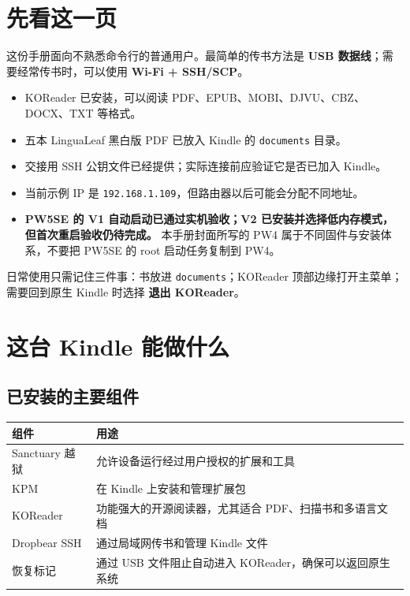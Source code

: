 \documentclass[10pt,a4paper]{article}
\begin{document}
\tableofcontents
\clearpage

\section{先看这一页}

这份手册面向不熟悉命令行的普通用户。最简单的传书方法是 \textbf{USB 数据线}；需要经常传书时，可以使用 \textbf{Wi-Fi + SSH/SCP}。

\begin{statusbox}
\begin{itemize}
  \item KOReader 已安装，可以阅读 PDF、EPUB、MOBI、DJVU、CBZ、DOCX、TXT 等格式。
  \item 五本 LinguaLeaf 黑白版 PDF 已放入 Kindle 的 \texttt{documents} 目录。
  \item 交接用 SSH 公钥文件已经提供；实际连接前应验证它是否已加入 Kindle。
  \item 当前示例 IP 是 \texttt{192.168.1.109}，但路由器以后可能会分配不同地址。
  \item \textbf{PW5SE 的 V1 自动启动已通过实机验收；V2 已安装并选择低内存模式，但首次重启验收仍待完成。} 本手册封面所写的 PW4 属于不同固件与安装体系，不要把 PW5SE 的 root 启动任务复制到 PW4。
\end{itemize}
\end{statusbox}

\begin{tipbox}
日常使用只需记住三件事：书放进 \texttt{documents}；KOReader 顶部边缘打开主菜单；需要回到原生 Kindle 时选择 \textbf{退出 KOReader}。
\end{tipbox}

\section{这台 Kindle 能做什么}

\subsection{已安装的主要组件}

\begin{longtable}{@{}p{}p{}@{}}
\toprule
\textbf{组件} & \textbf{用途} \\
\midrule
Sanctuary 越狱 & 允许设备运行经过用户授权的扩展和工具 \\
KPM & 在 Kindle 上安装和管理扩展包 \\
KOReader & 功能强大的开源阅读器，尤其适合 PDF、扫描书和多语言文档 \\
Dropbear SSH & 通过局域网传书和管理 Kindle 文件 \\
恢复标记 & 通过 USB 文件阻止自动进入 KOReader，确保可以返回原生系统 \\
\bottomrule
\end{longtable}
\end{document}
